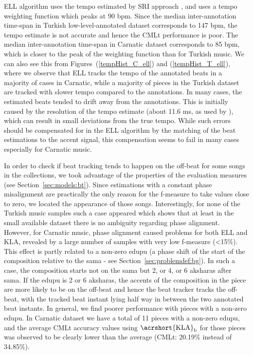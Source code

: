 \acrshort{ELL} algorithm uses the tempo estimated by \acrshort{SRI} approach \cite{ajay:12:beatWkShop}, and uses a tempo weighting function which peaks at 90 bpm. Since the median inter-annotation time-span in Turkish low-level-annotated dataset corresponds to 147 bpm, the tempo estimate is not accurate and hence the CMLt performance is poor. The median inter-annotation time-span in Carnatic dataset corresponds to 85 bpm, which is closer to the peak of the weighting function than for Turkish music. We can also see this from Figures~(\ref{tempHist_C_ell}) and (\ref{tempHist_T_ell}), where we observe that \acrshort{ELL} tracks the tempo of the annotated beats in a majority of cases in Carnatic, while a majority of pieces in the Turkish dataset are tracked with slower tempo compared to the annotations. In many cases, the estimated beats tended to drift away from the annotations. This is initially caused by the resolution of the tempo estimate (about 11.6 ms, as used by ), which can result in small deviations from the true tempo. While such errors should be compensated for in the \acrshort{ELL} algorithm by the matching of the beat estimations to the accent signal, this compensation seems to fail in many cases especially for Carnatic music. 

In order to check if beat tracking tends to happen on the off-beat for some songs in the collections, we took advantage of the properties of the evaluation measures (see Section~\ref{sec:models:bt}). Since estimations with a constant phase misalignment are practically the only reason for the f-measure to take values close to zero, we located the appearance of those songs. Interestingly, for none of the Turkish music samples such a case appeared which shows that at least in the small available dataset there is no ambiguity regarding phase alignment. However, for Carnatic music, phase alignment caused problems for both \acrshort{ELL} and \acrshort{KLA}, revealed by a large number of samples with very low f-measure (<15\%). This effect is partly related to a non-zero \gls{edupu} (a phase shift of the start of the composition relative to the sama - see Section~\ref{sec:problemdef:bg}). In such a case, the composition starts not on the sama but 2, or 4, or 6 \glspl{akshara} after \gls{sama}. If the \gls{edupu} is 2 or 6 \glspl{akshara}, the accents of the composition in the piece are more likely to be on the off-beat and hence the beat tracker tracks the off-beat, with the tracked beat instant lying half way in between the two annotated beat instants. In general, we find poorer performance with pieces with a non-zero \gls{edupu}. In Carnatic dataset we have a total of 11 pieces with a non-zero \gls{edupu}, and the average CMLt accuracy values using $\mathrm{\acrshort{KLA}}_{\mathrm{b}}$ for those pieces was observed to be clearly lower than the average (CMLt: 20.19\% instead of 34.85\%). 
